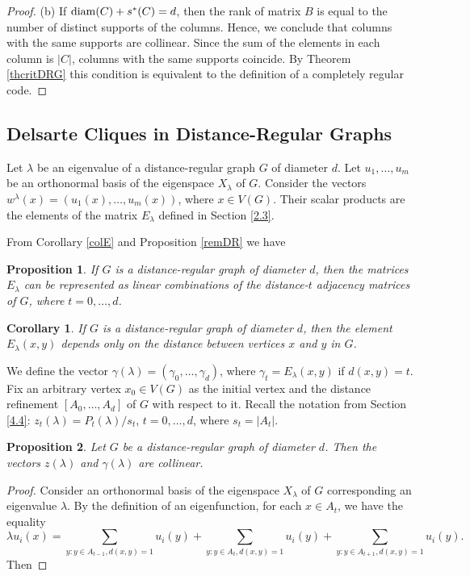 \documentclass[11pt]{article}
\newtheorem{claim}{Proposition}[section]
\newtheorem{corollary}{Corollary}[section]
\theoremstyle{definition}
\begin{document}
{{\begin{proof}
(b) If ${\rm diam}(C)+s^*(C)= d$, then the rank of matrix $B$ is equal to
the number of distinct supports of the columns. Hence, we conclude that columns with
the same supports are collinear. Since the sum of the elements in
each column is $|C|$, columns with the same supports
coincide. By Theorem \ref{thcritDRG} this condition is equivalent to the definition
of a completely regular code.
\end{proof}

\subsection{Delsarte Cliques in Distance-Regular Graphs}

Let $\lambda$ be an eigenvalue of a distance-regular graph
$G$ of diameter $d$. Let $u_1,\dots,u_m$ be an orthonormal basis
of the eigenspace $X_{\lambda}$ of $G$.
Consider the vectors
$w^\lambda(x)=(u_1(x),\dots,u_m(x))$, where $x\in V(G)$. Their scalar
products are the elements of the matrix $E_{\lambda}$ defined in Section \ref{2.3}.

From Corollary \ref{colE} and Proposition \ref{remDR} we have

\begin{claim}
If $G$ is a distance-regular graph of diameter $d$, then the matrices
$E_\lambda$ can be represented as linear combinations of the distance-$t$ adjacency matrices of $G$,
where $t=0,\dots,d$.
\end{claim}

\begin{corollary}\label{corElambda}
If $G$ is a distance-regular graph of diameter $d$, then the element
$E_\lambda(x,y)$ depends only on the distance between vertices $x$ and
$y$ in $G$.
\end{corollary}

We define the vector $\gamma(\lambda)=(\gamma_0,\dots,\gamma_d)$, where
$\gamma_t=E_\lambda(x,y)$ if $d(x,y)=t$. Fix an arbitrary
vertex $x_0\in V(G)$ as the initial vertex and the distance refinement
$[A_0,\dots,A_d]$ of $G$ with respect to it. Recall the notation
from Section \ref{4.4}: $z_t(\lambda)=P_t(\lambda)/s_t$,
$t=0,\dots,d$, where $s_t=|A_t|$.

\begin{claim}\label{c:ElemE}
Let $G$ be a distance-regular graph of diameter $d$. Then
the vectors $z(\lambda)$ and $\gamma(\lambda)$ are collinear.
\end{claim}
\begin{proof}
Consider an orthonormal basis
of the eigenspace $X_{\lambda}$ of $G$ corresponding
an eigenvalue $\lambda$. By the definition of an eigenfunction, for each $x\in A_t$, we have the equality $$\lambda u_i(x)=
\sum\limits_{y: y\in A_{t-1},d(x,y)=1}u_i(y)+ \sum\limits_{y: y\in
A_{t},d(x,y)=1}u_i(y)+\sum\limits_{y: y\in
A_{t+1},d(x,y)=1}u_i(y).$$ Then


\end{proof}}}
\end{document}
